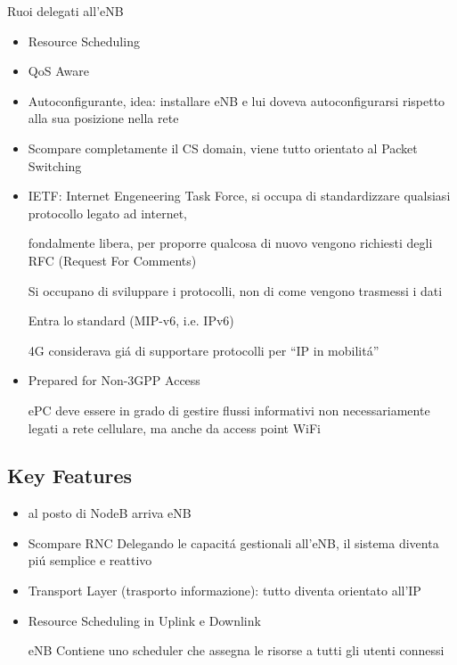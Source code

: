 \documentclass{article}
\begin{document}
Ruoi delegati all'eNB
\begin{itemize}
    \item Resource Scheduling
    \item QoS Aware
    \item Autoconfigurante, idea: installare eNB e lui doveva autoconfigurarsi rispetto alla sua posizione nella rete
\end{itemize}

\begin{itemize}
    \item Scompare completamente il CS domain, viene tutto orientato al Packet Switching
    \item IETF: Internet Engeneering Task Force, si occupa di standardizzare qualsiasi protocollo legato ad internet,

        fondalmente libera, per proporre qualcosa di nuovo vengono richiesti degli RFC (Request For Comments)

        Si occupano di sviluppare i protocolli, non di come vengono trasmessi i dati

        Entra lo standard (MIP-v6, i.e. IPv6)

        4G considerava gi\'a di supportare protocolli per ``IP in mobilit\'a''

    \item  Prepared for Non-3GPP Access

        ePC deve essere in grado di gestire flussi informativi non necessariamente legati a rete cellulare,
        ma anche da access point WiFi
\end{itemize}

\subsection{Key Features}

\begin{itemize}
    \item al posto di NodeB arriva eNB
    \item Scompare RNC
        Delegando le capacit\'a gestionali all'eNB, il sistema diventa pi\'u semplice e reattivo
    \item Transport Layer (trasporto informazione): tutto diventa orientato all'IP

    \item Resource Scheduling in Uplink e Downlink

        eNB Contiene uno scheduler che assegna le risorse a tutti gli utenti connessi
\end{itemize}
\end{document}
